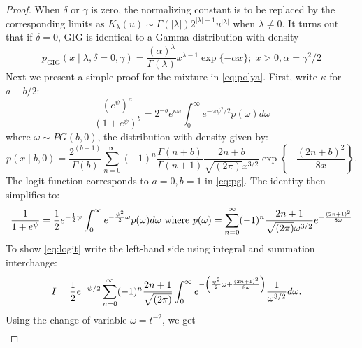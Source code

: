 \documentclass[lineno]{biometrika}
\begin{document}
\begin{proof}
When $\delta$ or $\gamma$ is zero, the normalizing constant is to be replaced by the corresponding limits as $K_{\lambda}(u) \sim \Gamma(|\lambda|)2^{|\lambda|-1} u^{|\lambda|}$ when $\lambda \neq 0$. It turns out that if $\delta=0$, GIG is identical to a Gamma distribution with density 
$$
p_{\mathrm{GIG}}(x \mid \lambda, \delta = 0 , \gamma) = \frac{(\alpha)^{\lambda}}{\Gamma(\lambda)} x^{\lambda-1} \exp\{ -\alpha x \}; \; x > 0, \alpha = \gamma^2 / 2 
$$
%
Next we present a simple proof for the \PG mixture in \eqref{eq:polya}. First, write $\kappa$ for $a-b/2$: 
\begin{equation}
  \frac{(e^{\psi})^a}{(1+e^{\psi})^b} = 2^{-b} e^{\kappa \omega} \int_0^{\infty} e^{-\omega \psi^2/2} p(\omega) d\omega \label{eq:pg}
\end{equation}
where $\omega \sim PG(b,0)$, the \PG distribution with density given by: 
$$
p(x \mid b, 0) = \frac{2^{(b-1)}}{\Gamma(b)} \sum_{n=0}^{\infty} (-1)^n \frac{\Gamma(n+b)}{\Gamma(n+1)} \frac{2n+b}{\sqrt{(2\pi)} x^{3/2}} \exp \left\{-\frac{(2n+b)^2}{8x} \right\}.
$$
The logit function corresponds to $a=0,b=1$ in \eqref{eq:pg}. The \CS identity then simplifies to:  
\begin{equation}
  \frac{1}{1+e^{\psi}} = \half e^{-\half \psi} \int_0^{\infty} e^{-\frac{\psi^2}{2} \omega} p(\omega) d\omega 
  \text{ where } p(\omega) = \sum_{n=0}^{\infty} (-1)^n \frac{2n+1}{\sqrt{(2\pi)} \omega^{3/2}} e^{-\frac{(2n+1)^2}{8\omega}}
  \label{eq:logit}
\end{equation}
To show \eqref{eq:logit} write the left-hand side using integral and summation interchange:
\begin{align*}
I & = \frac{1}{2} e^{-\psi/2}  \sum_{n=0}^{\infty} (-1)^n \frac{2n+1}{\sqrt{(2\pi)}} \int_0^{\infty} e^{- \left( \frac{\psi^2}{2}  \omega + \frac{(2n+1)^2}{8\omega} \right) } \frac{1}{\omega^{3/2}} d\omega. 
\end{align*}
Using the change of variable $\omega = t^{-2}$, we get 
\begin{align*}

\end{align*}
\end{proof}
\end{document}
